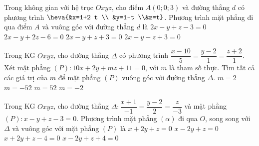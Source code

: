 \begin{ex}%
	Trong không gian với hệ trục $Oxyz$, cho điểm $A(0;0;3)$ và đường thẳng $d$ có phương trình $ \heva{&x=1+2 t \\ &y=1-t \\&z=t}$. Phương trình mặt phẳng đi qua điểm $A$ và vuông góc với đường thẳng $d$ là
	\choice
		{\True $2x-y+z-3=0$}
		{$2x-y+2 z-6=0$}
		{$2x-y+z+3=0$}
		{$2x-y-z+3=0$}
\end{ex}

\begin{ex}%
	Trong KG $Oxyz$, cho đường thẳng $\Delta$ có phương trình $\dfrac{x-10}{5}=\dfrac{y-2}{1}=\dfrac{z+2}{1}$. Xét mặt phẳng $(P)\colon 10x+2y+m z+11=0$, với $m$ là tham số thực. Tìm tất cả các giá trị của $m$ để mặt phẳng $(P)$ vuông góc với đường thẳng $\Delta$.
	\choice 
		{\True $m=2$}
		{$m=-52$}
		{$m=52$}
		{$m=-2$}
\end{ex}

\begin{ex}%
	Trong KG $Oxyz$, cho đường thẳng $\Delta\colon \dfrac{x+1}{-1}=\dfrac{y-2}{2}=\dfrac{z}{-3}$ và mặt phẳng $(P)\colon x-y+z-3=0$. Phương trình mặt phẳng $(\alpha)$ đi qua $O$, song song với $\Delta$ và vuông góc với mặt phẳng $(P)$ là
	\choice 
		{\True $x+2 y+z=0$}
		{$x-2 y+z=0$}
		{$x+2 y+z-4=0$}
		{$x-2 y+z+4=0$}
\end{ex}